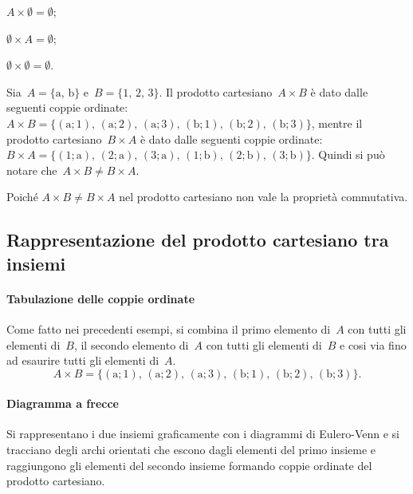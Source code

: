 \begin{enumeratea}
 \item $A\times \emptyset =\emptyset$;
 \item $\emptyset \times A=\emptyset$;
 \item $\emptyset \times \emptyset =\emptyset$.
\end{enumeratea}

\begin{exrig}
 \begin{esempio}
Sia~$A=\{\text{a, b}\}$ e~$B=\{\text{1, 2, 3}\}$. Il prodotto cartesiano~$A\times B$ è dato dalle seguenti coppie ordinate:
$A\times B=\{(\text{a};1)\text{, }(\text{a};2)\text{, }(\text{a};3)\text{, }(\text{b};1)\text{, }(\text{b};2)\text{, }(\text{b};3)\}$, mentre il prodotto cartesiano~$B\times A$
è dato dalle seguenti coppie ordinate:
$B\times A=\{(1;\text{a})\text{, }(2;\text{a})\text{, }(3;\text{a})\text{, }(1;\text{b})\text{, }(2;\text{b})\text{, }(3;\text{b})\}$.
Quindi si può notare che~$A\times B\neq B\times A$.
 \end{esempio}
\end{exrig}

Poiché $A\times B\neq B\times A$ nel prodotto cartesiano non vale la
proprietà commutativa.

\vspazio\ovalbox{\risolvii \ref{ese:\thechapter.72}, \ref{ese:\thechapter.73}, \ref{ese:\thechapter.74}, \ref{ese:\thechapter.75}, \ref{ese:\thechapter.76}, \ref{ese:\thechapter.77}}

\subsection{Rappresentazione del prodotto cartesiano tra insiemi}
\paragraph{Tabulazione delle coppie ordinate}

Come fatto nei precedenti esempi, si combina il primo elemento
di~$A$ con tutti gli elementi di~$B$, il secondo elemento
di~$A$ con tutti gli elementi di~$B$ e cosi via fino ad
esaurire tutti gli elementi di~$A$.
\[A\times B=\{(\text{a};1)\text{, }(\text{a};2)\text{, }(\text{a};3)\text{, }(\text{b};1)\text{, }(\text{b};2)\text{, }(\text{b};3)\}.\]

\paragraph{Diagramma a frecce}
Si rappresentano i due insiemi graficamente
con i diagrammi di Eulero-Venn e si tracciano degli archi orientati che
escono dagli elementi del primo insieme e raggiungono gli elementi del
secondo insieme formando coppie ordinate del prodotto cartesiano.
\begin{center}

\end{center}

